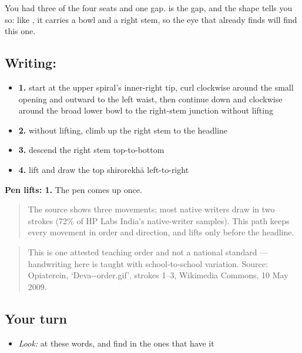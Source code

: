 You had three of the four seats and one gap. \textbf{} is the gap, and the shape tells you so: like , it carries a bowl and a right stem, so the eye that already finds  will find this one.

\subsection*{Writing: }

\begin{itemize}
\raggedright
  \item \textbf{1.} start at the upper spiral's inner-right tip, curl clockwise around the small opening and outward to the left waist, then continue down and clockwise around the broad lower bowl to the right-stem junction without lifting
  \item \textbf{2.} without lifting, climb up the right stem to the headline
  \item \textbf{3.} descend the right stem top-to-bottom
  \item \textbf{4.} lift and draw the top shirorekhā left-to-right
\end{itemize}

\textbf{Pen lifts: 1.} The pen comes up once.

\begin{quote}
The source shows three movements; most native writers draw  in two strokes (72\% of HP Labs India's native-writer samples). This path keeps every movement in order and direction, and lifts only before the headline.
\end{quote}

\begin{quote}
This is one attested teaching order and not a national standard — handwriting here is taught with school-to-school variation. Source: Opiaterein, ‘Deva--order.gif’, strokes 1–3, Wikimedia Commons, 10 May 2009.
\end{quote}

\subsection*{Your turn}
\begin{itemize}
\raggedright
  \item \emph{Look:} at these words, and find  in the ones that have it
\end{itemize}

